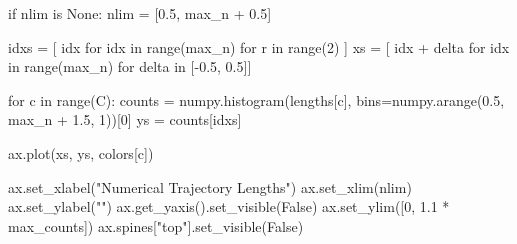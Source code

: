 \documentclass[
  letterpaper,
  DIV=11,
  numbers=noendperiod]{scrartcl}
\newenvironment{Shaded}{\begin{snugshade}}{\end{snugshade}}
\newcommand{\BuiltInTok}[1]{\textcolor[rgb]{0.00,0.23,0.31}{#1}}
\newcommand{\ControlFlowTok}[1]{\textcolor[rgb]{0.00,0.23,0.31}{#1}}
\newcommand{\DecValTok}[1]{\textcolor[rgb]{0.68,0.00,0.00}{#1}}
\newcommand{\FloatTok}[1]{\textcolor[rgb]{0.68,0.00,0.00}{#1}}
\newcommand{\KeywordTok}[1]{\textcolor[rgb]{0.00,0.23,0.31}{#1}}
\newcommand{\NormalTok}[1]{\textcolor[rgb]{0.00,0.23,0.31}{#1}}
\newcommand{\OperatorTok}[1]{\textcolor[rgb]{0.37,0.37,0.37}{#1}}
\newcommand{\StringTok}[1]{\textcolor[rgb]{0.13,0.47,0.30}{#1}}
\newcommand{\VariableTok}[1]{\textcolor[rgb]{0.07,0.07,0.07}{#1}}
\begin{document}
\begin{Shaded}
\begin{Highlighting}[]
  \ControlFlowTok{if}\NormalTok{ nlim }\KeywordTok{is} \VariableTok{None}\NormalTok{:}
\NormalTok{    nlim }\OperatorTok{=}\NormalTok{ [}\FloatTok{0.5}\NormalTok{, max\_n }\OperatorTok{+} \FloatTok{0.5}\NormalTok{]}
  
\NormalTok{  idxs }\OperatorTok{=}\NormalTok{ [ idx }\ControlFlowTok{for}\NormalTok{ idx }\KeywordTok{in} \BuiltInTok{range}\NormalTok{(max\_n) }\ControlFlowTok{for}\NormalTok{ r }\KeywordTok{in} \BuiltInTok{range}\NormalTok{(}\DecValTok{2}\NormalTok{) ]}
\NormalTok{  xs }\OperatorTok{=}\NormalTok{ [ idx }\OperatorTok{+}\NormalTok{ delta }\ControlFlowTok{for}\NormalTok{ idx }\KeywordTok{in} \BuiltInTok{range}\NormalTok{(max\_n) }\ControlFlowTok{for}\NormalTok{ delta }\KeywordTok{in}\NormalTok{ [}\OperatorTok{{-}}\FloatTok{0.5}\NormalTok{, }\FloatTok{0.5}\NormalTok{]]}
  
  \ControlFlowTok{for}\NormalTok{ c }\KeywordTok{in} \BuiltInTok{range}\NormalTok{(C):}
\NormalTok{    counts }\OperatorTok{=}\NormalTok{ numpy.histogram(lengths[c], }
\NormalTok{                             bins}\OperatorTok{=}\NormalTok{numpy.arange(}\FloatTok{0.5}\NormalTok{, max\_n }\OperatorTok{+} \FloatTok{1.5}\NormalTok{, }\DecValTok{1}\NormalTok{))[}\DecValTok{0}\NormalTok{]}
\NormalTok{    ys }\OperatorTok{=}\NormalTok{ counts[idxs]}
    
\NormalTok{    ax.plot(xs, ys, colors[c])}
  
\NormalTok{  ax.set\_xlabel(}\StringTok{"Numerical Trajectory Lengths"}\NormalTok{)}
\NormalTok{  ax.set\_xlim(nlim)}
\NormalTok{  ax.set\_ylabel(}\StringTok{""}\NormalTok{)}
\NormalTok{  ax.get\_yaxis().set\_visible(}\VariableTok{False}\NormalTok{)}
\NormalTok{  ax.set\_ylim([}\DecValTok{0}\NormalTok{, }\FloatTok{1.1} \OperatorTok{*}\NormalTok{ max\_counts])}
\NormalTok{  ax.spines[}\StringTok{"top"}\NormalTok{].set\_visible(}\VariableTok{False}\NormalTok{)}
\end{Highlighting}
\end{Shaded}
\end{document}
